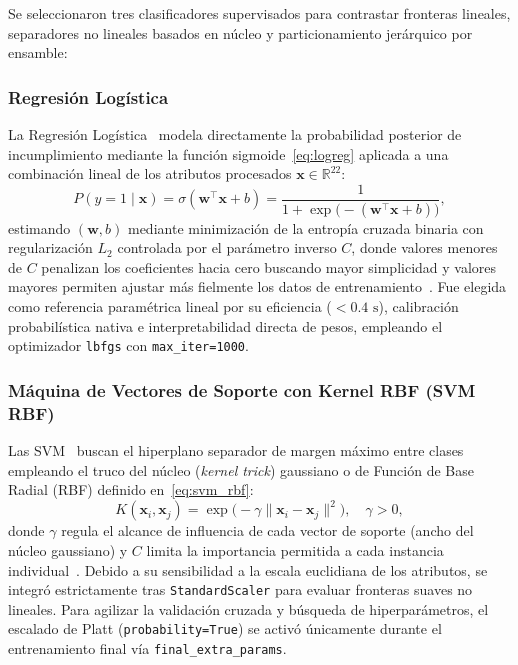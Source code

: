 \documentclass[conference]{IEEEtran}
\begin{document}
Se seleccionaron tres clasificadores supervisados para contrastar fronteras lineales, separadores no lineales basados en núcleo y particionamiento jerárquico por ensamble:

\subsubsection{Regresión Logística}
La Regresión Logística~\cite{cox1958regression,muller2016introduction} modela directamente la probabilidad posterior de incumplimiento mediante la función sigmoide~\eqref{eq:logreg} aplicada a una combinación lineal de los atributos procesados $\mathbf{x} \in \mathbb{R}^{22}$:
\begin{equation}
P(y = 1 \mid \mathbf{x}) = \sigma(\mathbf{w}^\top \mathbf{x} + b) = \frac{1}{1 + \exp\big(-(\mathbf{w}^\top \mathbf{x} + b)\big)},
\label{eq:logreg}
\end{equation}
estimando $(\mathbf{w}, b)$ mediante minimización de la entropía cruzada binaria con regularización $L_2$ controlada por el parámetro inverso $C$, donde valores menores de $C$ penalizan los coeficientes hacia cero buscando mayor simplicidad y valores mayores permiten ajustar más fielmente los datos de entrenamiento~\cite{muller2016introduction}. Fue elegida como referencia paramétrica lineal por su eficiencia ($<0.4\text{ s}$), calibración probabilística nativa e interpretabilidad directa de pesos, empleando el optimizador \texttt{lbfgs} con \texttt{max\_iter=1000}.

\subsubsection{Máquina de Vectores de Soporte con Kernel RBF (SVM RBF)}
Las SVM~\cite{cortes1995support,muller2016introduction} buscan el hiperplano separador de margen máximo entre clases empleando el truco del núcleo (\textit{kernel trick}) gaussiano o de Función de Base Radial (RBF) definido en~\eqref{eq:svm_rbf}:
\begin{equation}
K(\mathbf{x}_i, \mathbf{x}_j) = \exp\big(-\gamma \|\mathbf{x}_i - \mathbf{x}_j\|^2\big), \quad \gamma > 0,
\label{eq:svm_rbf}
\end{equation}
donde $\gamma$ regula el alcance de influencia de cada vector de soporte (ancho del núcleo gaussiano) y $C$ limita la importancia permitida a cada instancia individual~\cite{muller2016introduction}. Debido a su sensibilidad a la escala euclidiana de los atributos, se integró estrictamente tras \texttt{StandardScaler} para evaluar fronteras suaves no lineales. Para agilizar la validación cruzada y búsqueda de hiperparámetros, el escalado de Platt (\texttt{probability=True}) se activó únicamente durante el entrenamiento final vía \texttt{final\_extra\_params}.
\end{document}
